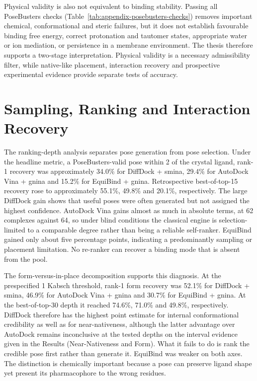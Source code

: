 Physical validity is also not equivalent to binding stability. Passing all PoseBusters checks (Table~\ref{tab:appendix-posebusters-checks}) removes important chemical, conformational and steric failures, but it does not establish favourable binding free energy, correct protonation and tautomer states, appropriate water or ion mediation, or persistence in a membrane environment. The thesis therefore supports a two-stage interpretation. Physical validity is a necessary admissibility filter, while native-like placement, interaction recovery and prospective experimental evidence provide separate tests of accuracy.

\hypertarget{sampling-ranking-and-interaction-recovery}{%
\section{Sampling, Ranking and Interaction Recovery}\label{sampling-ranking-and-interaction-recovery}}

The ranking-depth analysis separates pose generation from pose selection. Under the headline metric, a PoseBusters-valid pose within 2 \angstrom{} of the crystal ligand, rank-1 recovery was approximately 34.0\% for DiffDock + smina, 29.4\% for AutoDock Vina + gnina and 15.2\% for EquiBind + gnina. Retrospective best-of-top-15 recovery rose to approximately 55.1\%, 49.8\% and 20.1\%, respectively. The large DiffDock gain shows that useful poses were often generated but not assigned the highest confidence. AutoDock Vina gains almost as much in absolute terms, at 62 complexes against 64, so under blind conditions the classical engine is selection-limited to a comparable degree rather than being a reliable self-ranker. EquiBind gained only about five percentage points, indicating a predominantly sampling or placement limitation. No re-ranker can recover a binding mode that is absent from the pool.

The form-versus-in-place decomposition supports this diagnosis. At the prespecified 1 \angstrom{} Kabsch threshold, rank-1 form recovery was 52.1\% for DiffDock + smina, 46.9\% for AutoDock Vina + gnina and 30.7\% for EquiBind + gnina. At the best-of-top-30 depth it reached 74.6\%, 71.0\% and 49.8\%, respectively. DiffDock therefore has the highest point estimate for internal conformational credibility as well as for near-nativeness, although the latter advantage over AutoDock remains inconclusive at the tested depths on the interval evidence given in the Results (Near-Nativeness and Form). What it fails to do is rank the credible pose first rather than generate it. EquiBind was weaker on both axes. The distinction is chemically important because a pose can preserve ligand shape yet present its pharmacophore to the wrong residues.

